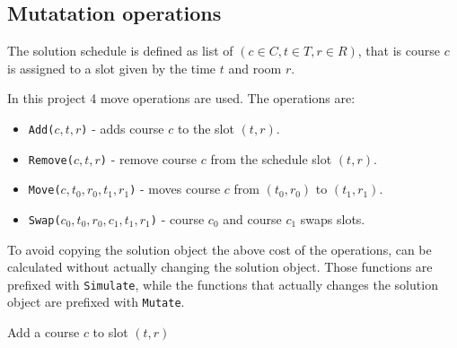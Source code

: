 \subsection{Mutatation operations}
\label{sec:mutate-operations}

The solution schedule is defined as list of $(c \in C, t \in T, r \in R)$, that is course $c$ is assigned to a slot given by the time $t$ and room $r$.

In this project 4 move operations are used. The operations are:
\begin{itemize}
\item \texttt{Add($c, t, r$)} - adds course $c$ to the slot $(t, r)$.  
\item \texttt{Remove($c, t, r$)} - remove course $c$ from the schedule slot $(t, r)$.
\item \texttt{Move($c, t_0, r_0, t_1, r_1$)} - moves course $c$ from $(t_0, r_0)$ to $(t_1, r_1)$.
\item \texttt{Swap($c_0, t_0, r_0, c_1, t_1, r_1$)} - course $c_0$ and course $c_1$ swaps slots.
\end{itemize}

To avoid copying the solution object the above cost of the operations, can be calculated without actually changing the solution object. Those functions are prefixed with \texttt{Simulate}, while the functions that actually changes the solution object are prefixed with \texttt{Mutate}.

\begin{algorithm}[H]
  \caption{Add a course $c$ to slot $(t, r)$}
  \begin{algorithmic}[1]
       
          \State {}
      \EndIf
      \State {} 
    \EndFunction
    
    \Statex
             
        \EndIf
    \EndFunction
  \end{algorithmic}
\end{algorithm}


